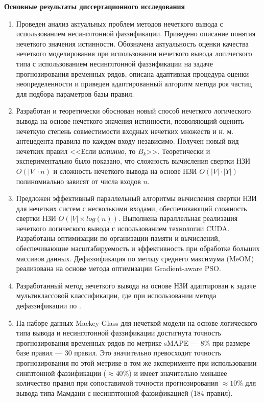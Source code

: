 \textbf{Основные результаты диссертационного исследования}
\begin{enumerate}
  \item Проведен анализ актуальных проблем методов нечеткого вывода с использованием несинглтонной фаззификации. Приведено описание понятия нечеткого значения истинности. Обозначена актуальность оценки качества нечеткого моделирования при использовании нечеткого вывода логического типа с использованием несинглтонной фаззификации на задаче прогнозирования временных рядов, описана адаптивная процедура оценки неопределенности и приведен адаптированный алгоритм метода роя частиц для подбора параметров базы правил.
  \item Разработан и теоретически обоснован новый способ нечеткого логического вывода на основе нечеткого значения истинности, позволяющий оценить нечеткую степень совместимости входных нечетких множеств и н. м. антецедента правила по каждом входу независимо. Получен новый вид нечетких правил <<Если \textit{истинно}, то $B_k$>>. Теоретически и экспериментально было показано, что сложность вычисления свертки НЗИ $O(|V|\cdot n)$ и сложность нечеткого вывода на основе НЗИ  $O(|V|\cdot |Y|)$ полиномиально зависят от числа входов $n$.
  \item Предложен эффективный параллельный алгоритмы вычисления свертки НЗИ для нечетких систем с несколькими входами, обеспечивающий сложность свертки НЗИ $O(|V|\times log(n))$. Выполнена параллельная реализация нечеткого логического вывода с использованием технологии CUDA. Разработаны оптимизации по организации памяти и вычислений, обеспечивающие масштабируемость и эффективность при обработке больших массивов данных. 
  Дефаззификация по методу среднего максимума (MeOM) реализована на основе метода оптимизации Gradient-aware PSO.
  \item Разработанный метод нечеткого вывода на основе НЗИ адаптирован к задаче мультиклассовой классификации, где при использовании метода дефаззификации по .
  \item На наборе данных Mackey-Glass для нечеткой модели на основе логического типа вывода и несинглтонной фаззификации достигнута точность прогнозирования временных рядов по метрике sMAPE --- $8\%$ при размере базе правил --- 30 правил. Это значительно превосходит точность прогнозирования по этой метрике в том же эксперименте при использовании синглтонной фаззификации ($\approx 40\%$) и имеет значительно меньшее количество правил при сопоставимой точности прогнозирования $\approx 10\%$ для вывода типа Мамдани с несинглтонной фаззификацией (184 правил).

\end{enumerate}
